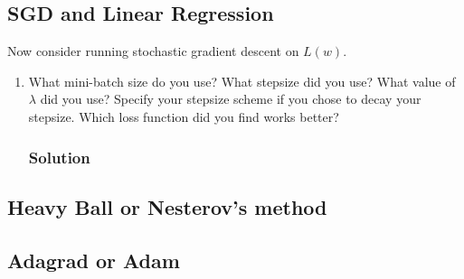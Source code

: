 \documentclass[letterpaper,11pt]{article}
\begin{document}
\subsection*{SGD and Linear Regression}


Now consider running stochastic gradient descent on $L(w)$.

\begin{enumerate}  
\item What mini-batch size do you use? What stepsize did you use? What value of
  $\lambda$ did you use? Specify your stepsize scheme if you chose to decay your
  stepsize. Which loss function did you find works better?

  \subsubsection*{Solution}
\end{enumerate}

\subsection*{Heavy Ball or Nesterov's method}

\subsection*{Adagrad or Adam}
\end{document}
